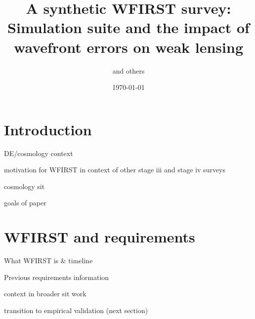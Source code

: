 \documentclass[aps,prd, amsmath,amssymb,superscriptaddress,showkeys,nofootinbib,reprint,preprintnumbers]{revtex4-1}
\begin{document}
\title{A synthetic WFIRST survey: Simulation suite and the impact of wavefront errors on weak lensing}

\author{and others}


\noaffiliation

\date{\today}

\label{firstpage}

\begin{abstract}
\end{abstract}

\keywords{}

\maketitle


\section{Introduction}\label{sec:intro}

DE/cosmology context

motivation for WFIRST in context of other stage iii and stage iv surveys

cosmology sit

goals of paper

\section{WFIRST and requirements}\label{sec:wfirst}

What WFIRST is \& timeline

Previous requirements information

context in broader sit work

transition to empirical validation (next section)
\end{document}
